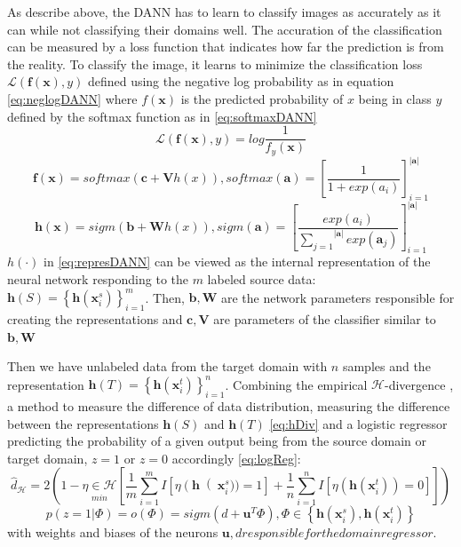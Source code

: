 As describe above, the DANN has to learn to classify images as accurately as it can while not classifying their domains well. The accuration of the classification can be measured by a loss function that indicates how far the prediction is from the reality. To classify the image, it learns to minimize the classification loss $\mathcal{L}(\bm{f}(\bm{x}), y)$ defined using the negative log probability as in equation \ref{eq:neglogDANN} where $f(\bm{x})$ is the predicted probability of $x$ being in class $y$ defined by the softmax function as in \ref{eq:softmaxDANN} 
 	\begin{equation} \label{eq:neglogDANN}
			\mathcal{L}(\bm{f}(\bm{x}), y) = log\frac{1}{f_y(\bm{x})}
	\end{equation} 	
	\begin{equation} \label{eq:softmaxDANN}
			\bm{f}(\bm{x}) = softmax(\bm{c} + \bm{V}h(x)),
			softmax(\bm{a}) = \left[\frac{1}{1+exp(a_i)}\right]_{i=1}^{|\bm{a}|}
	\end{equation}
	\begin{equation} \label{eq:represDANN}
			\bm{h}(\bm{x}) = sigm(\bm{b} + \bm{W}h(x)), 
			sigm(\bm{a}) = \left[\frac{exp(a_i)}{\overset{|\bm{a}|}{\underset{j=1}{\sum}}exp(\bm{a}_j)}\right]_{i=1}^{|\bm{a}|}
	\end{equation}
$h(\cdot)$ in \ref{eq:represDANN} can be viewed as the internal representation of the neural network responding to the $m$ labeled source data: $\bm{h}(S) = \left\{\bm{h}(\bm{x}_i^s)\right\}_{i=1}^m$. Then, $\bm{b}, \bm{W}$ are the network parameters responsible for creating the representations and $\bm{c}, \bm{V}$ are parameters of the classifier similar to $\bm{b}, \bm{W}$ 

Then we have unlabeled data from the target domain with $n$ samples and the representation $\bm{h}(T) = \left\{ \bm{h}(\bm{x}_i^t)\right\}_{i=1}^{n}$. Combining the empirical $\mathcal{H}$-divergence \cite{DArepres, H-Kifer}, a method to measure the difference of data distribution, measuring the difference between the representations $\bm{h}(S)$ and $\bm{h}(T)$ \eqref{eq:hDiv} and a logistic regressor predicting the probability of a given output being from the source domain or target domain, $z = 1$ or $z = 0$ accordingly \eqref{eq:logReg}:
 	\begin{equation} \label{eq:hDiv} 
			\hat{d}_{\mathcal{H}} = 2\left(1 - \underset{min}{\eta \in \mathcal{H}}\left[\frac{1}{m}\underset{i=1}{\overset{m}{\sum}}I\left[\eta \left(\bm{h}\right(\bm{x}_i^s)) = 1\right] + \frac{1}{n}\underset{i=1}{\overset{n}{\sum}}I\left[\eta \left(\bm{h}\left(\bm{x}_i^t\right)\right) = 0\right]\right]\right) 
	\end{equation} 
	\begin{equation} \label{eq:logReg} 
			p(z =1 | \Phi) = o(\Phi) = sigm(d+\bm{u}^T\Phi), \Phi \in \left\{\bm{h}(\bm{x}_i^s), \bm{h}(\bm{x}_i^t)\right\}
	\end{equation} 
with weights and biases of the neurons $\bm{u}, d responsible for the domain regressor$.

